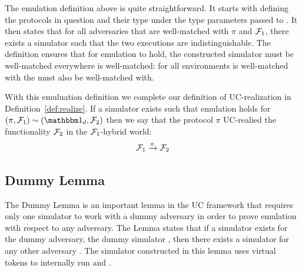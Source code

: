 The emulation definition above is quite straightforward. It starts with defining the protocols in question and their type under the type parameters passed to .
It then states that for all adversaries that are well-matched with $\pi$ and $\mathcal{F}_1$, there exists a simulator such that the two executions are indistinguishable. 
The definition ensures that for emulation to hold, the constructed simulator must be well-matched everywhere \A is well-matched: for all environments \A is well-matched with the \Sim must also be well-matched with.

With this emuluation definition we complete our definition of UC-realization in Definition~\ref{def:realize}.
If a simulator exists such that emulation holds for $(\pi, \F_1) \sim (\idealP, \F_2)$ then we say that the protocol $\pi$ UC-realied the functionality $\mathcal{F}_2$ in the $\mathcal{F}_1$-hybrid world:
\[
	\mathcal{F}_1 \xrightarrow{\pi} \mathcal{F}_2
\]


%

\subsection{Dummy Lemma}
The Dummy Lemma is an important lemma in the UC framework that requires only one simulator to work with a dummy adversary in order to prove emulation with respect to any adversary.
The Lemma states that if a simulator exists for the dummy adversary, the dummy simulator \DS, then there exists a simulator for any other adversary \A. 
The simulator constructed in this lemma uses virtual tokens to internally run \DS and \A.

